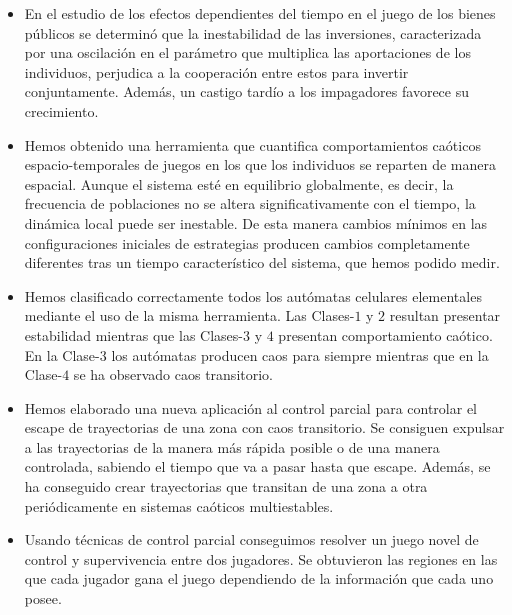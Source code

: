 \begin{itemize}

\item En el estudio de los efectos dependientes del tiempo en el juego de los bienes públicos se determinó que la inestabilidad de las inversiones, caracterizada por una oscilación en el parámetro que multiplica las aportaciones de los individuos, perjudica a la cooperación entre estos para invertir conjuntamente. Además, un castigo tardío a los impagadores favorece su crecimiento.

\item  Hemos obtenido una herramienta que cuantifica comportamientos caóticos espacio-temporales de juegos en los que los individuos se reparten de manera espacial. Aunque el sistema esté en equilibrio globalmente, es decir, la frecuencia de poblaciones no se altera significativamente con el tiempo, la dinámica local puede ser inestable. De esta manera cambios mínimos en las configuraciones iniciales de estrategias producen cambios completamente diferentes tras un tiempo característico del sistema, que hemos podido medir.

\item Hemos clasificado correctamente todos los autómatas celulares elementales mediante el uso de la misma herramienta. Las Clases-$1$ y $2$ resultan presentar estabilidad mientras que las Clases-$3$ y $4$ presentan comportamiento caótico. En la Clase-$3$ los autómatas producen caos para siempre mientras que en la Clase-$4$ se ha observado caos transitorio.


\item Hemos elaborado una nueva aplicación al control parcial para controlar el escape de trayectorias de una zona con caos transitorio. Se consiguen expulsar a las trayectorias de la manera más rápida posible o de una manera controlada, sabiendo el tiempo que va a pasar hasta que escape. Además, se ha conseguido crear trayectorias que transitan de una zona a otra periódicamente en sistemas caóticos multiestables.


\item  Usando técnicas de control parcial conseguimos resolver un juego novel de control y supervivencia entre dos jugadores. Se obtuvieron las regiones en las que cada jugador gana el juego dependiendo de la información que cada uno posee.



\end{itemize}
